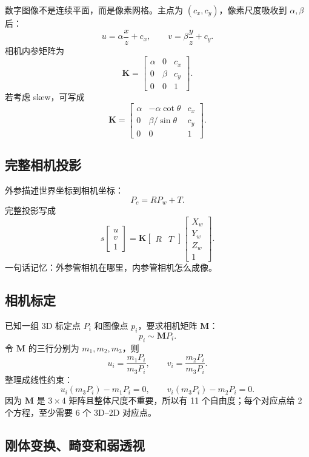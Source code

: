 \documentclass[11pt]{article}
\newcommand{\K}{\mathbf{K}}
\newcommand{\M}{\mathbf{M}}
\begin{document}
数字图像不是连续平面，而是像素网格。主点为 $(c_x,c_y)$，像素尺度吸收到 $\alpha,\beta$ 后：
\[
  u = \alpha \frac{x}{z}+c_x,\qquad
  v = \beta \frac{y}{z}+c_y.
\]
相机内参矩阵为
\[
  \K =
  \begin{bmatrix}
    \alpha & 0 & c_x\\
    0 & \beta & c_y\\
    0 & 0 & 1
  \end{bmatrix}.
\]
若考虑 skew，可写成
\[
  \K =
  \begin{bmatrix}
    \alpha & -\alpha \cot \theta & c_x\\
    0 & \beta/\sin\theta & c_y\\
    0 & 0 & 1
  \end{bmatrix}.
\]

\subsection{完整相机投影}

外参描述世界坐标到相机坐标：
\[
  P_c = R P_w + T.
\]
完整投影写成
\[
  s
  \begin{bmatrix}
    u\\v\\1
  \end{bmatrix}
  =
  \K
  \begin{bmatrix}
    R & T
  \end{bmatrix}
  \begin{bmatrix}
    X_w\\Y_w\\Z_w\\1
  \end{bmatrix}.
\]
一句话记忆：外参管相机在哪里，内参管相机怎么成像。

\subsection{相机标定}

已知一组 3D 标定点 $P_i$ 和图像点 $p_i$，要求相机矩阵 $\M$：
\[
  p_i \sim \M P_i.
\]
令 $\M$ 的三行分别为 $m_1,m_2,m_3$，则
\[
  u_i = \frac{m_1P_i}{m_3P_i},\qquad
  v_i = \frac{m_2P_i}{m_3P_i}.
\]
整理成线性约束：
\[
  u_i(m_3P_i)-m_1P_i=0,\qquad
  v_i(m_3P_i)-m_2P_i=0.
\]
因为 $\M$ 是 $3\times4$ 矩阵且整体尺度不重要，所以有 11 个自由度；每个对应点给 2 个方程，至少需要 6 个 3D--2D 对应点。

\subsection{刚体变换、畸变和弱透视}
\end{document}
